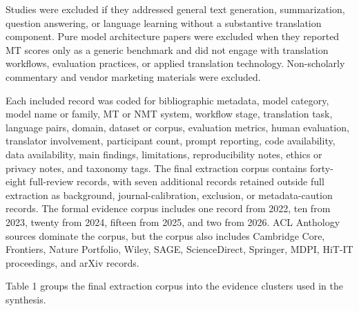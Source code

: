 \documentclass[11pt]{article}
\begin{document}
Studies were excluded if they addressed general text generation, summarization, question answering, or language learning without a substantive translation component. Pure model architecture papers were excluded when they reported MT scores only as a generic benchmark and did not engage with translation workflows, evaluation practices, or applied translation technology. Non-scholarly commentary and vendor marketing materials were excluded.

Each included record was coded for bibliographic metadata, model category, model name or family, MT or NMT system, workflow stage, translation task, language pairs, domain, dataset or corpus, evaluation metrics, human evaluation, translator involvement, participant count, prompt reporting, code availability, data availability, main findings, limitations, reproducibility notes, ethics or privacy notes, and taxonomy tags. The final extraction corpus contains forty-eight full-review records, with seven additional records retained outside full extraction as background, journal-calibration, exclusion, or metadata-caution records. The formal evidence corpus includes one record from 2022, ten from 2023, twenty from 2024, fifteen from 2025, and two from 2026. ACL Anthology sources dominate the corpus, but the corpus also includes Cambridge Core, Frontiers, Nature Portfolio, Wiley, SAGE, ScienceDirect, Springer, MDPI, HiT-IT proceedings, and arXiv records.

Table 1 groups the final extraction corpus into the evidence clusters used in the synthesis.
\end{document}

